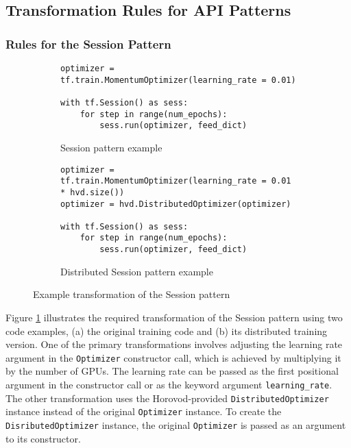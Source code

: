 \subsection{Transformation Rules for API Patterns}


\subsubsection{Rules for the Session Pattern}

\begin{figure}[ht!]
  \begin{subfigure}[t]{0.45\textwidth}
    \begin{lstlisting}[style=mpython]
optimizer = tf.train.MomentumOptimizer(learning_rate = 0.01)

with tf.Session() as sess:
    for step in range(num_epochs): 
        sess.run(optimizer, feed_dict)\end{lstlisting}
    \caption{Session pattern example}
  \end{subfigure}
  \hspace{5mm}
  \begin{subfigure}[t]{0.45\textwidth}
    \begin{lstlisting}[style=mpython]
optimizer = tf.train.MomentumOptimizer(learning_rate = 0.01 * hvd.size())
optimizer = hvd.DistributedOptimizer(optimizer)

with tf.Session() as sess:
    for step in range(num_epochs): 
        sess.run(optimizer, feed_dict)\end{lstlisting}
    \caption{Distributed Session pattern example}
  \end{subfigure}
  \caption{Example transformation of the Session pattern}
  \label{fig:trans:sessiontrans}
\end{figure}

Figure \ref{fig:trans:sessiontrans} illustrates the required transformation of
the Session pattern using two code examples, (a) the original training code and
(b) its distributed training version.
One of the primary transformations involves adjusting the learning rate
argument in the {\tt Optimizer} constructor call, which is achieved by
multiplying it by the number of GPUs.
The learning rate can be passed as the first positional argument in the
constructor call or as the keyword argument {\tt learning\_rate}.
The other transformation uses the Horovod-provided {\tt DistributedOptimizer}
instance instead of the original {\tt Optimizer} instance. 
To create the {\tt DisributedOptimizer} instance, the original {\tt Optimizer}
is passed as an argument to its constructor.

